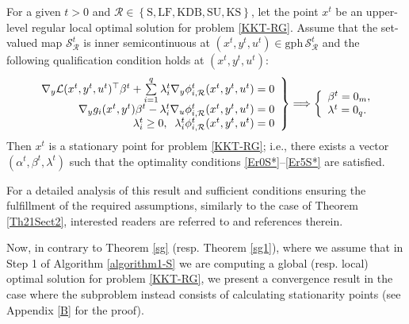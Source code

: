 \begin{theorem}\label{Optimality conditions for RMPCC(t)-S}For a given $t>0$ and $\mathcal{R}\in \left\{\mbox{S}, \mbox{LF}, \mbox{KDB}, \mbox{SU}, \mbox{KS}\right\}$, let the point $x^{t}$ be an upper-level regular local optimal solution for problem \eqref{KKT-RG}.
	Assume that the set-valued map $\mathcal{S}^{t}_\mathcal{R}$ is inner
	semicontinuous at $(x^{t},y^{t},u^{t})\in\mathrm{gph}\,\mathcal{S}^{t}_\mathcal{R}$ and
	the following qualification condition holds at $(x^{t},y^{t},u^{t})$:
	\begin{equation}
	\left.
	\begin{array}
	[c]{r}
	\nabla_{y}\mathcal{L}(x^{t},y^{t},u^{t})^{\top}\beta^{t}+\sum\limits_{i=1}
	^{q} \lambda^t_{i}\nabla_{y}
\phi^t_{i, \mathcal{R}}(x^{t},y^{t},u^{t}) =0\\
	\nabla_{y}g_{i}(x^{t},y^{t})\beta^{t}-\lambda^t_{i}\nabla_{u}
\phi^t_{i, \mathcal{R}}(x^{t},y^{t},u^{t})=0\\
	\lambda^t_i\geq 0, \;\;  \lambda^t_i \phi^t_{i, \mathcal{R}}(x^{t},y^{t},u^{t}) =0
	\end{array}
	\right\}  \Longrightarrow\left\{
	\begin{array}
	[c]{l}
	\beta^t=0_{m},\\
	\lambda^t=0_{q}.
	\end{array}
	\right. \label{CQS}
	\end{equation}
	Then $x^t$ is a stationary point for problem \eqref{KKT-RG}; i.e., there exists a vector $(\alpha^{t}, \beta^{t}, \lambda^{t})$ such that the optimality conditions  \eqref{Er0S*}--\eqref{Er5S*} are satisfied.
	\end{theorem}
For a detailed analysis of this result and sufficient conditions ensuring the fulfillment of the required assumptions, similarly to the case of Theorem \ref{Th21Sect2}, interested readers are referred to \cite{D2,D3,DMZns2019,Zemkoho} and references therein.

Now, in contrary to Theorem \ref{sg} (resp. Theorem  \ref{sg1}), where we assume that in Step 1 of Algorithm \ref{algorithm1-S} we are computing a global (resp. local) optimal solution for problem \eqref{KKT-RG}, we present a convergence result in the case where the subproblem instead consists of calculating stationarity points (see Appendix \ref{B} for the proof). 

